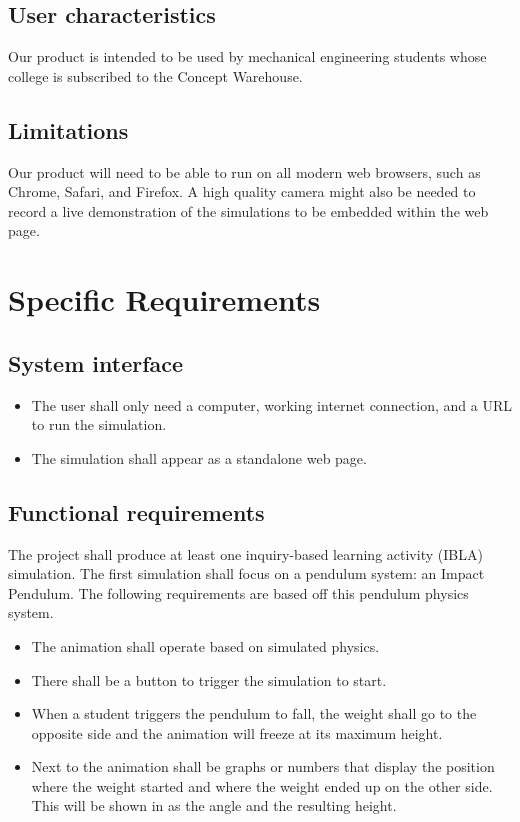 \documentclass[onecolumn, draftclsnofoot,10pt, compsoc]{IEEEtran}
\begin{document}
\subsection{User characteristics}
Our product is intended to be used by mechanical engineering students whose college is subscribed to the Concept Warehouse.
\subsection{Limitations}
Our product will need to be able to run on all modern web browsers, such as Chrome, Safari, and Firefox. A high quality camera might also be needed to record a live demonstration of the simulations to be embedded within the web page.
\section{Specific Requirements}
\subsection{System interface}
\begin{itemize}
\item The user shall only need a computer, working internet connection, and a URL to run the simulation.
\item The simulation shall appear as a standalone web page.
\end{itemize}
\subsection{Functional requirements}
The project shall produce at least one inquiry-based learning activity (IBLA) simulation. The first simulation shall focus on a pendulum system: an Impact Pendulum. The following requirements are based off this pendulum physics system. 
\begin{itemize}
\item The animation shall operate based on simulated physics.
\item There shall be a button to trigger the simulation to start.
\item When a student triggers the pendulum to fall, the weight shall go to the opposite side and the animation will freeze at its maximum height.
\item Next to the animation shall be graphs or numbers that display the position where the weight started and where the weight ended up on the other side. This will be shown in as the angle and the resulting height. 
\end{itemize}
\end{document}
